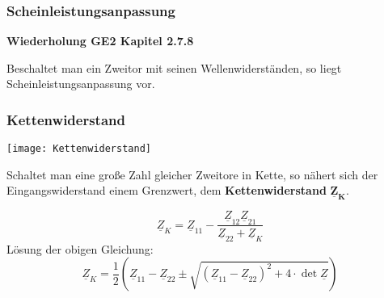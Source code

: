 \subsubsection{Scheinleistungsanpassung}
\textbf{Wiederholung GE2 Kapitel 2.7.8}

Beschaltet man ein Zweitor mit seinen Wellenwiderständen, so liegt
Scheinleistungsanpassung vor.

\subsubsection{Kettenwiderstand}
\centering
\texttt{[image: Kettenwiderstand]}

\raggedright
Schaltet man eine große Zahl gleicher Zweitore in Kette, so nähert sich der
Eingangswiderstand einem Grenzwert, dem \textbf{Kettenwiderstand} $\mathbf{\underline{Z}_K}$.

\[
    \underline{Z}_K = \underline{Z}_{11} - \frac{\underline{Z}_{12}\underline{Z}_{21}}{\underline{Z}_{22}+\underline{Z}_K}
\]
L\"osung der obigen Gleichung:
\[
    \underline{Z}_K = \frac{1}{2}(\underline{Z}_{11} - \underline{Z}_{22} \pm \sqrt{(\underline{Z}_{11}-\underline{Z}_{22})^2+4\cdot\operatorname{det}\underline{Z}})
\]
\footnotesize
{\color{red}{Für symmetrische Zweitore entspricht der Kettenwiderstand dem Wellenwiderstand.  }}
\normalsize
